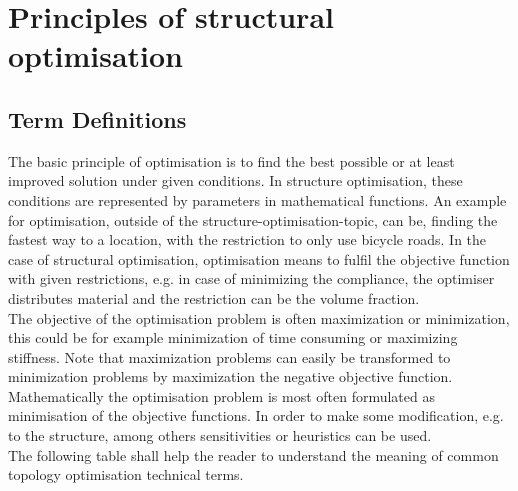 \chapter{Principles of structural optimisation}
 
 \section{Term Definitions}
 \label{subsection_term_princip}
 The basic principle of optimisation is to find the best possible or at least improved solution under given conditions. In structure optimisation, these conditions are represented by parameters in mathematical functions. An example for optimisation, outside of the structure-optimisation-topic, can be, finding the fastest way to a location, with
 the restriction to only use bicycle roads.
 In the case of structural optimisation, optimisation means to fulfil the 
 objective function with given restrictions, e.g. in case of
 minimizing the compliance, the optimiser distributes material and
 the restriction can be the volume fraction.\\
 
 The objective of the optimisation problem is often maximization or minimization, this could be for example minimization of time consuming or maximizing stiffness. Note that maximization problems can easily be transformed to minimization problems by maximization the negative objective function. Mathematically the optimisation problem is most often formulated as minimisation of the objective functions. In order to make some modification, e.g. to the structure, among others sensitivities or heuristics can be used.\\
 
The following table shall help the reader to understand the meaning of common topology optimisation technical terms.


